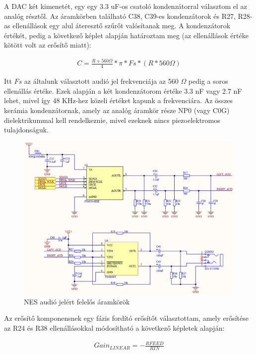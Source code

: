 	A DAC két kimenetét, egy egy 3.3 uF-os csatoló kondenzátorral választom el az analóg résztől. Az áramkörben található C38, C39-es kondenzátorok és R27, R28-as ellenállások egy alul áteresztő szűrőt valósítanak meg. A kondenzátorok értékét, pedig a következő képlet alapján határoztam meg (az ellenállások értéke kötött volt az erősítő miatt):
	
	\begin{align}	
		C = \frac{R + 560 \Omega}{4} *\pi * Fs * (R * 560 \Omega)
	\end{align} 
	
	Itt $Fs$ az általunk választott audió jel frekvenciája az 560 $\Omega$ pedig a soros ellenállás értéke. Ezek alapján a két kondenzátorom értéke 3.3 nF vagy 2.7 nF lehet, mivel így 48 KHz-hez közeli értéket kapunk a frekvenciára. Az összes kerámia kondenzátornak, amely az analóg áramkör része NP0 (vagy C0G) dielektrikummal kell rendelkeznie, mivel ezeknek nincs piezoelektromos tulajdonságuk.   
	
	\begin{figure}[H]
		\centering
		\includegraphics[width=150mm, keepaspectratio]{figures/DAC-AMP-JACK}
		\caption{NES audió jelért felelős áramkörök}
		\label{fig:DAC-AMP-JACK}
	\end{figure}
	
	Az erősítő komponensnek egy fázis fordító erősítőt választottam, amely erősítése az R24 és R38 ellenállásokkal módosítható a következő képletek alapján:
	
	\begin{align}	
		Gain_{LINEAR} = -\frac{RFEED}{RIN}
	\end{align} 
	
